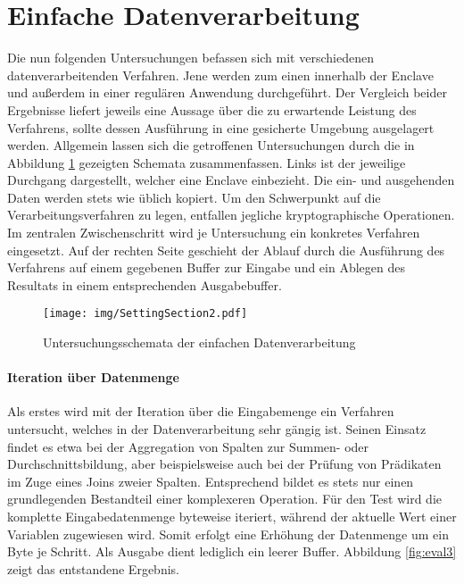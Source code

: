 \section{Einfache Datenverarbeitung}

Die nun folgenden Untersuchungen befassen sich mit verschiedenen datenverarbeitenden Verfahren. Jene werden zum einen innerhalb der Enclave und außerdem in einer regulären Anwendung durchgeführt. Der Vergleich beider Ergebnisse liefert jeweils eine Aussage über die zu erwartende Leistung des Verfahrens, sollte dessen Ausführung in eine gesicherte Umgebung ausgelagert werden. Allgemein lassen sich die getroffenen Untersuchungen durch die in Abbildung \ref{fig:settingsection2} gezeigten Schemata zusammenfassen. Links ist der jeweilige Durchgang dargestellt, welcher eine Enclave einbezieht. Die ein- und ausgehenden Daten werden stets wie üblich kopiert. Um den Schwerpunkt auf die Verarbeitungsverfahren zu legen, entfallen jegliche kryptographische Operationen. Im zentralen Zwischenschritt wird je Untersuchung ein konkretes Verfahren eingesetzt. Auf der rechten Seite geschieht der Ablauf durch die Ausführung des Verfahrens auf einem gegebenen Buffer zur Eingabe und ein Ablegen des Resultats in einem entsprechenden Ausgabebuffer.

\begin{figure}[h]
	\texttt{[image: img/SettingSection2.pdf]}
	\centering
	\caption{Untersuchungsschemata der einfachen Datenverarbeitung}
	\label{fig:settingsection2}
\end{figure}

\paragraph{Iteration über Datenmenge}

Als erstes wird mit der Iteration über die Eingabemenge ein Verfahren untersucht, welches in der Datenverarbeitung sehr gängig ist. Seinen Einsatz findet es etwa bei der Aggregation von Spalten zur Summen- oder Durchschnittsbildung, aber beispielsweise auch bei der Prüfung von Prädikaten im Zuge eines Joins zweier Spalten. Entsprechend bildet es stets nur einen grundlegenden Bestandteil einer komplexeren Operation. Für den Test wird die komplette Eingabedatenmenge byteweise iteriert, während der aktuelle Wert einer Variablen zugewiesen wird. Somit erfolgt eine Erhöhung der Datenmenge um ein Byte je Schritt. Als Ausgabe dient lediglich ein leerer Buffer. Abbildung \ref{fig:eval3} zeigt das entstandene Ergebnis.

